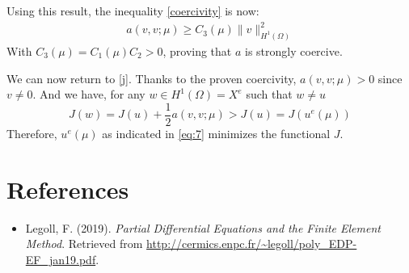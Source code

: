 \documentclass[
	english,
	11pt, %
]{fphw}
\begin{document}
\noindent Using this result, the inequality \eqref{coercivity} is now:
\begin{align*}
	a(v,v;\mu) \geq C_3(\mu) \lVert v \rVert_{H^1(\Omega)}^2 
\end{align*}
With $C_3(\mu ) =C_1(\mu) C_2 > 0$, proving that $a$ is strongly coercive.


We can now return to \cref{j}. Thanks to the proven coercivity, $a(v,v;\mu) > 0$ since $v \neq 0$. And we have, for any $w \in H^1(\Omega)=X^e$ such that $w \neq u$
$$
J(w) = J(u) + \frac{1}{2}a(v,v;\mu) > J(u) = J(u^e(\mu))
$$Therefore, $u^e(\mu)$ as indicated in \eqref{eq:7} minimizes the functional $J$.



\clearpage
\section*{References}
\begin{itemize}
	\item Legoll, F. (2019). \textit{Partial Differential Equations and the Finite Element Method}. Retrieved from \url{http://cermics.enpc.fr/~legoll/poly_EDP-EF_jan19.pdf}.
\end{itemize}
\end{document}
